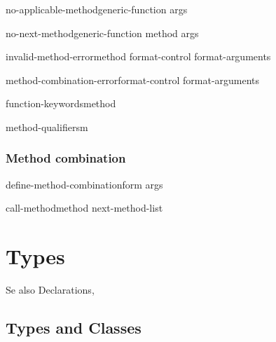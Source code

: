 \documentclass[10pt,english]{book}
\begin{document}
\begin{generic}{no-applicable-method}{generic-function \rest args}
  
\end{generic}

\begin{generic}{no-next-method}{generic-function method \rest args}
  
\end{generic}

\begin{function}{invalid-method-error}{method format-control \rest format-arguments}
  
\end{function}

\begin{function}{method-combination-error}{format-control \rest format-arguments}
  
\end{function}

\begin{generic}{function-keywords}{method}
  
\end{generic}

\begin{generic}{method-qualifiers}{m}
  
\end{generic}

\subsection{Method combination}
\label{sec:method-combination}

\begin{macro}{define-method-combination}{\whole form \rest args}
  
\end{macro}

\begin{macro}{call-method}{method \op next-method-list}
  
\end{macro}



\chapter{Types}
\label{cha:types}

Se also Declarations, 

\section{Types and Classes}
\label{sec:types-classes}
\end{document}
